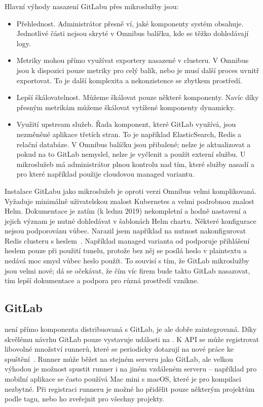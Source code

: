         Hlavní výhody nasazení GitLabu přes mikroslužby jsou:
        \begin{itemize}
            \item Přehlednost. Administrátor přesně ví, jaké komponenty systém obsahuje. Jednotlivé části nejsou skryté v Omnibus balíčku, kde se těžko dohledávají logy.
            \item Metriky mohou přímo využívat exportery nasazené v clusteru. V Omnibus jsou k dispozici pouze metriky pro celý balík, nebo je musí další proces uvnitř exportovat. To je další komplexita a nekonzistence se zbytkem prostředí.
            \item Lepší škálovatelnost. Můžeme škálovat pouze některé komponenty. Navíc díky přesným metrikám můžeme škálovat vytížené komponenty dynamicky.
            \item Využití upstream služeb. Řada komponent, které GitLab využívá, jsou nezměněné aplikace třetích stran. To je například ElasticSearch, Redis a relační databáze. V Omnibus balíčku jsou přibalené; nelze je aktualizovat a pokud na to GitLab nemyslel, nelze je vyčlenit a použít externí službu. U mikroslužeb má administrátor plnou kontrolu nad tím, které služby nasadí a pro které například použije cloudovou managed variantu.
        \end{itemize}

        Instalace GitLabu jako mikroslužeb je oproti verzi Omnibus velmi komplikovaná. Vyžaduje minimálně uživatelskou znalost Kubernetes a velmi podrobnou znalost Helm. Dokumentace je zatím (k lednu 2019) nekompletní a hodně nastavení a jejich význam je nutné dohledávat v šablonách Helm chartu. Některé konfigurace nejsou podporovánu vůbec. Narazil jsem například na nutnost nakonfigurovat Redis clusteru s heslem~\cite{gitlab-helm-issue-redis}. Například managed varianta od  podporuje přihlášení heslem pouze při použití  tunelu, protože bez něj se posílá heslo v plaintextu a nedává moc smysl vůbec heslo použít. To souvisí s tím, že GitLab mikroslužby jsou velmi nové; dá se očekávat, že čím víc firem bude takto GitLab nasazovat, tím lepší dokumentace a podpora pro různá prostředí vznikne.

    \subsection{GitLab \CI}
        \CI není přímo komponenta distribuovaná s GitLab, je ale dobře zaintegrovaná. Díky skvělému návrhu GitLab pouze vystavuje události na . K API se může registrovat libovolné množství runnerů, které se periodicky  dotazují na nové práce ke spuštění~\cite{gitlab-runner-registration}. Runner může běžet na stejném serveru jako GitLab, ale velkou výhodou je možnost spustit runner i na jiném vzdáleném serveru -- například pro mobilní aplikace se často používá Mac mini s macOS, které je pro kompilaci nezbytné. Při registraci runneru je možné ho přidělit pouze některým projektům podle tagu, nebo ho zveřejnit pro všechny projekty.


